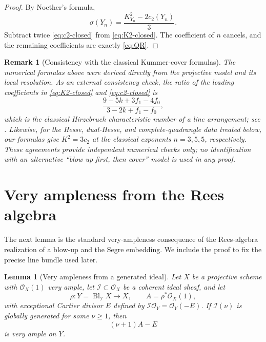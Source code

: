 \documentclass[11pt]{article}
\newtheorem{lemma}[theorem]{Lemma}
\newtheorem{remark}[theorem]{Remark}
\newcommand{\OO}{\mathcal O}
\newcommand{\cI}{\mathcal I}
\newcommand{\Bl}{\operatorname{Bl}}
\newcommand{\sig}{\sigma}
\begin{document}
\begin{proof}
By Noether's formula,
\[
        \sig(Y_n)=\frac{K_{Y_n}^2-2c_2(Y_n)}3.
\]
Subtract twice \eqref{eq:c2-closed} from \eqref{eq:K2-closed}.  The coefficient
of $n$ cancels, and the remaining coefficients are exactly \eqref{eq:QR}.
\end{proof}

\begin{remark}[Consistency with the classical Kummer-cover formulas]\label{rem:classical-consistency}
The numerical formulas above were derived directly from the projective model and
its local resolution.  As an external consistency check, the ratio of the leading
coefficients in \eqref{eq:K2-closed} and \eqref{eq:c2-closed} is
\[
 \frac{9-5k+3f_1-4f_0}{3-2k+f_1-f_0},
\]
which is the classical Hirzebruch characteristic number of a line arrangement;
see \cite{Hirzebruch,BarthelHirzebruchHoefer,Pokora2019}.  Likewise, for the Hesse,
dual-Hesse, and complete-quadrangle data treated below, our formulas give
$K^2=3c_2$ at the classical exponents $n=3,5,5$, respectively.  These agreements
provide independent numerical checks only; no identification with an alternative
``blow up first, then cover'' model is used in any proof.
\end{remark}

\section{Very ampleness from the Rees algebra}\label{sec:rees}

The next lemma is the standard very-ampleness consequence of the Rees-algebra
realization of a blow-up and the Segre embedding.  We include the proof to fix the
precise line bundle used later.

\begin{lemma}[Very ampleness from a generated ideal]\label{lem:rees-segre}
Let $X$ be a projective scheme with $\OO_X(1)$ very ample, let
$\cI\subset\OO_X$ be a coherent ideal sheaf, and let
\[
        \rho:Y=\Bl_{\cI}X\to X,
        \qquad
        A=\rho^*\OO_X(1),
\]
with exceptional Cartier divisor $E$ defined by
$\cI\OO_Y=\OO_Y(-E)$.  If $\cI(\nu)$ is globally generated for some
$\nu\ge1$, then
\[
        (\nu+1)A-E
\]
is very ample on $Y$.
\end{lemma}
\end{document}
